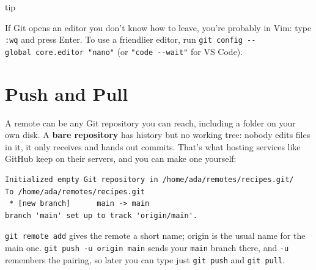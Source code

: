 \begin{callout}{tip}

If Git opens an editor you don't know how to leave, you're probably in Vim: type \texttt{:wq} and press Enter. To use a friendlier editor, run \texttt{git\ config\ -}\allowbreak{}\texttt{-}\allowbreak{}\texttt{global\ core.}\allowbreak{}\texttt{editor\ "nano"} (or \texttt{"code\ -\/-wait"} for VS Code).

\end{callout}

\section{Push and Pull}\label{08-git-every-day:push-and-pull}

A remote can be any Git repository you can reach, including a folder on your own disk. A \textbf{bare repository} has history but no working tree: nobody edits files in it, it only receives and hands out commits. That's what hosting services like GitHub keep on their servers, and you can make one yourself:

\begin{codeblock}

\begin{Shaded}
\begin{Highlighting}[]
\end{Highlighting}
\end{Shaded}

\end{codeblock}

\begin{codeblock}
\begin{Verbatim}[formatcom=\outputstyle]
Initialized empty Git repository in /home/ada/remotes/recipes.git/
To /home/ada/remotes/recipes.git
 * [new branch]      main -> main
branch 'main' set up to track 'origin/main'.
\end{Verbatim}
\end{codeblock}

\texttt{git\ remote\ add} gives the remote a short name; origin is the usual name for the main one. \texttt{git\ push\ -u\ origin\ main} sends your \texttt{main} branch there, and \texttt{-u} remembers the pairing, so later you can type just \texttt{git\ push} and \texttt{git\ pull}.

